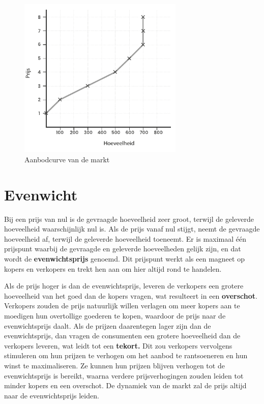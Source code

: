 \begin{figure}[H]
\centering
    \includegraphics[width=0.7\textwidth]{figures/fig25.pdf}
    \caption[Aanbodcurve van de markt]{Aanbodcurve van de markt}
    \label{fig25}
\end{figure}


\hypertarget{evenwicht}{%
\section{Evenwicht}\label{evenwicht}}

Bij een prijs van nul is de gevraagde hoeveelheid zeer groot, terwijl de geleverde hoeveelheid waarschijnlijk nul is. Als de prijs vanaf nul stijgt, neemt de gevraagde hoeveelheid af, terwijl de geleverde hoeveelheid toeneemt. Er is maximaal één prijspunt waarbij de gevraagde en geleverde hoeveelheden gelijk zijn, en dat wordt de \textbf{evenwichtsprijs} genoemd. Dit prijspunt werkt als een magneet op kopers en verkopers en trekt hen aan om hier altijd rond te handelen.

Als de prijs hoger is dan de evenwichtsprijs, leveren de verkopers een grotere hoeveelheid van het goed dan de kopers vragen, wat resulteert in een \textbf{overschot}. Verkopers zouden de prijs natuurlijk willen verlagen om meer kopers aan te moedigen hun overtollige goederen te kopen, waardoor de prijs naar de evenwichtsprijs daalt. Als de prijzen daarentegen lager zijn dan de evenwichtsprijs, dan vragen de consumenten een grotere hoeveelheid dan de verkopers leveren, wat leidt tot een \textbf{tekort.} Dit zou verkopers vervolgens stimuleren om hun prijzen te verhogen om het aanbod te rantsoeneren en hun winst te maximaliseren. Ze kunnen hun prijzen blijven verhogen tot de evenwichtsprijs is bereikt, waarna verdere prijsverhogingen zouden leiden tot minder kopers en een overschot. De dynamiek van de markt zal de prijs altijd naar de evenwichtsprijs leiden.

